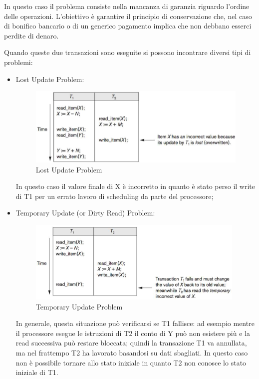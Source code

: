 In questo caso il problema consiste nella mancanza di garanzia riguardo l’ordine delle operazioni. L’obiettivo è garantire il principio di conservazione che, nel caso di bonifico bancario o di un generico pagamento implica che non debbano esserci perdite di denaro.

Quando queste due transazioni sono eseguite si possono incontrare diversi tipi di problemi:

\begin{itemize}

\item Lost Update Problem:

\begin{center}
\begin{figure}[H]
\centering
\includegraphics[scale=1]{figures/lup.png}
\caption{Lost Update Problem}
\end{figure}
\end{center}

In questo caso il valore finale di X è incorretto in quanto è stato perso il write di T1 per un errato lavoro di scheduling da parte del processore;

\item Temporary Update (or Dirty Read) Problem:

\begin{center}
\begin{figure}[H]
\centering
\includegraphics[scale=1]{figures/tup.png}
\caption{Temporary Update Problem}
\end{figure}
\end{center}

In generale, questa situazione può verificarsi se T1 fallisce: ad esempio mentre il processore esegue le istruzioni di T2 il conto di Y può non esistere più e la read successiva può restare bloccata; quindi la transazione T1 va annullata, ma nel frattempo T2 ha lavorato basandosi su dati sbagliati. In questo caso non è possibile tornare allo stato iniziale in quanto T2 non conosce lo stato iniziale di T1.


\end{itemize}
